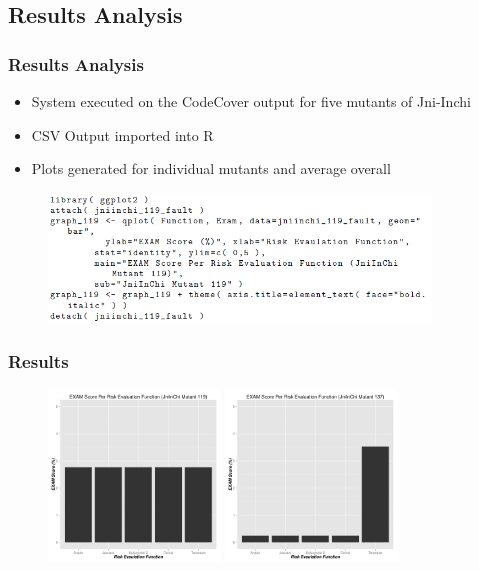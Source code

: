 \documentclass{beamer}
\begin{document}
	\subsection{Results Analysis}
	\begin{frame}
	\frametitle{Results Analysis}
	\begin{itemize}
		\item System executed on the CodeCover output for five mutants of Jni-Inchi
		\pause
		\item CSV Output imported into R
		\pause
		\item Plots generated for individual mutants and average overall
	\end{itemize}
	
	\begin{figure}
		\label{r}
		\includegraphics[width=4in]{img/ggplot}
	\end{figure}
	\end{frame}
	\begin{frame}
	\frametitle{Results}
	\begin{figure}
		\label{results}
		\includegraphics[width=1.8in]{img/graph_119.pdf}
		\includegraphics[width=1.8in]{img/graph_137.pdf}
	\end{figure}
	\end{frame}
\end{document}
